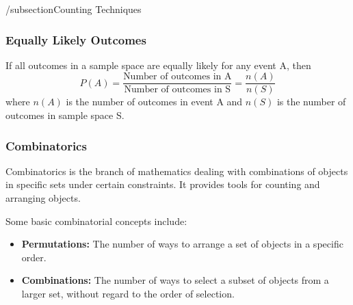 /subsection{Counting Techniques}
\hrulefill

\subsubsection*{Equally Likely Outcomes}
If all outcomes in a sample space are equally likely for any event A, then
\begin{equation*}
    P(A) = \frac{\text{Number of outcomes in A}}{\text{Number of outcomes in S}} = \frac{n(A)}{n(S)}
\end{equation*}
where $n(A)$ is the number of outcomes in event A and $n(S)$ is the number of outcomes in sample space S.

\subsubsection*{Combinatorics}
Combinatorics is the branch of mathematics dealing with combinations of objects in specific sets under certain constraints. It provides tools for counting and arranging objects.

Some basic combinatorial concepts include:

\begin{itemize}
    \item \textbf{Permutations:} The number of ways to arrange a set of objects in a specific order.
    \item \textbf{Combinations:} The number of ways to select a subset of objects from a larger set, without regard to the order of selection.
\end{itemize}

